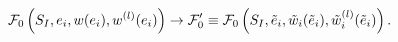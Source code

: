 \begin{equation}
{\cal F}_{0}\left( S_{I},e_{i},w(e_{i}),w^{(l)}(e_{i})\right) \rightarrow
{\cal F}_{0}^{\prime }\equiv {\cal F}_{0}\left( S_{I},\tilde{e}_{i},\tilde{w}%
_{i}(\tilde{e}_{i}),\tilde{w}_{i}^{(l)}(\tilde{e}_{i})\right) .
\end{equation}

